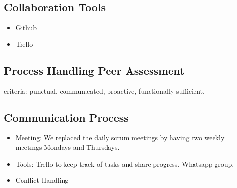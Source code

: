 \documentclass[11pt]{article}
\begin{document}
\subsection{Collaboration Tools}
\begin{itemize}
	\item Github
	\item Trello
\end{itemize}
\subsection{Process Handling Peer Assessment}
criteria: punctual, communicated, proactive, functionally sufficient. 
\subsection{Communication Process}
\begin{itemize}
	\item Meeting: We replaced the daily scrum meetings by having two weekly meetings Mondays and Thursdays.
	\item Tools: Trello to keep track of tasks and share progress. Whatsapp group.
	\item Conflict Handling
\end{itemize}
\end{document}

